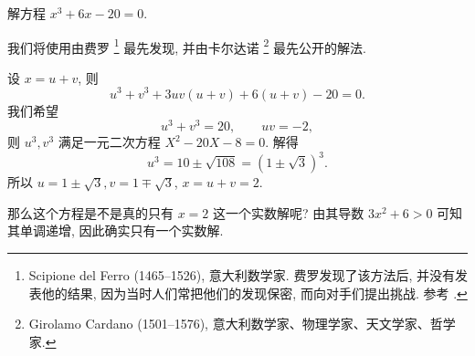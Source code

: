 \begin{example}
  解方程 $x^3+6x-20=0$.
\end{example}

我们将使用由费罗%
  \footnote{%
    Scipione del Ferro (1465--1526), 意大利数学家.
    费罗发现了该方法后, 并没有发表他的结果, 因为当时人们常把他们的发现保密, 而向对手们提出挑战. 参考 \cite[第13章4节]{Kline1990}.
  }%
最先发现, 并由卡尔达诺%
  \footnote{%
    Girolamo Cardano (1501--1576), 意大利数学家、物理学家、天文学家、哲学家.%
  }%
最先公开的解法.

\begin{solution}
  设 $x=u+v$, 则
    \[u^3+v^3+3uv(u+v)+6(u+v)-20=0.\]
  我们希望
    \[u^3+v^3=20,\qquad uv=-2,\]
  则 $u^3,v^3$ 满足一元二次方程 $X^2-20X-8=0$.
  解得
    \[u^3=10\pm\sqrt{108}{=(1\pm\sqrt3)^3.}\]
  所以 $u=1\pm\sqrt3, v=1\mp\sqrt 3$, $x=u+v=2$.
\end{solution}

那么这个方程是不是真的只有 $x=2$ 这一个实数解呢?
由其导数 $3x^2+6>0$ 可知其单调递增, 因此确实只有一个实数解.


